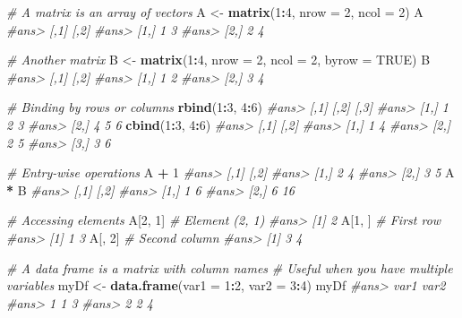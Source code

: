 \documentclass[]{book}
\newenvironment{Shaded}{\begin{snugshade}}{\end{snugshade}}
\newcommand{\KeywordTok}[1]{\textcolor[rgb]{0.13,0.29,0.53}{\textbf{#1}}}
\newcommand{\DataTypeTok}[1]{\textcolor[rgb]{0.13,0.29,0.53}{#1}}
\newcommand{\DecValTok}[1]{\textcolor[rgb]{0.00,0.00,0.81}{#1}}
\newcommand{\StringTok}[1]{\textcolor[rgb]{0.31,0.60,0.02}{#1}}
\newcommand{\CommentTok}[1]{\textcolor[rgb]{0.56,0.35,0.01}{\textit{#1}}}
\newcommand{\OtherTok}[1]{\textcolor[rgb]{0.56,0.35,0.01}{#1}}
\newcommand{\OperatorTok}[1]{\textcolor[rgb]{0.81,0.36,0.00}{\textbf{#1}}}
\newcommand{\NormalTok}[1]{#1}
\theoremstyle{definition}
\theoremstyle{definition}
\theoremstyle{definition}
\theoremstyle{remark}
\begin{document}
\begin{Shaded}
\begin{Highlighting}[]
\CommentTok{# A matrix is an array of vectors}
\NormalTok{A <-}\StringTok{ }\KeywordTok{matrix}\NormalTok{(}\DecValTok{1}\OperatorTok{:}\DecValTok{4}\NormalTok{, }\DataTypeTok{nrow =} \DecValTok{2}\NormalTok{, }\DataTypeTok{ncol =} \DecValTok{2}\NormalTok{)}
\NormalTok{A}
\CommentTok{#ans>      [,1] [,2]}
\CommentTok{#ans> [1,]    1    3}
\CommentTok{#ans> [2,]    2    4}

\CommentTok{# Another matrix}
\NormalTok{B <-}\StringTok{ }\KeywordTok{matrix}\NormalTok{(}\DecValTok{1}\OperatorTok{:}\DecValTok{4}\NormalTok{, }\DataTypeTok{nrow =} \DecValTok{2}\NormalTok{, }\DataTypeTok{ncol =} \DecValTok{2}\NormalTok{, }\DataTypeTok{byrow =} \OtherTok{TRUE}\NormalTok{)}
\NormalTok{B}
\CommentTok{#ans>      [,1] [,2]}
\CommentTok{#ans> [1,]    1    2}
\CommentTok{#ans> [2,]    3    4}

\CommentTok{# Binding by rows or columns}
\KeywordTok{rbind}\NormalTok{(}\DecValTok{1}\OperatorTok{:}\DecValTok{3}\NormalTok{, }\DecValTok{4}\OperatorTok{:}\DecValTok{6}\NormalTok{)}
\CommentTok{#ans>      [,1] [,2] [,3]}
\CommentTok{#ans> [1,]    1    2    3}
\CommentTok{#ans> [2,]    4    5    6}
\KeywordTok{cbind}\NormalTok{(}\DecValTok{1}\OperatorTok{:}\DecValTok{3}\NormalTok{, }\DecValTok{4}\OperatorTok{:}\DecValTok{6}\NormalTok{)}
\CommentTok{#ans>      [,1] [,2]}
\CommentTok{#ans> [1,]    1    4}
\CommentTok{#ans> [2,]    2    5}
\CommentTok{#ans> [3,]    3    6}

\CommentTok{# Entry-wise operations}
\NormalTok{A }\OperatorTok{+}\StringTok{ }\DecValTok{1}
\CommentTok{#ans>      [,1] [,2]}
\CommentTok{#ans> [1,]    2    4}
\CommentTok{#ans> [2,]    3    5}
\NormalTok{A }\OperatorTok{*}\StringTok{ }\NormalTok{B}
\CommentTok{#ans>      [,1] [,2]}
\CommentTok{#ans> [1,]    1    6}
\CommentTok{#ans> [2,]    6   16}

\CommentTok{# Accessing elements}
\NormalTok{A[}\DecValTok{2}\NormalTok{, }\DecValTok{1}\NormalTok{] }\CommentTok{# Element (2, 1)}
\CommentTok{#ans> [1] 2}
\NormalTok{A[}\DecValTok{1}\NormalTok{, ] }\CommentTok{# First row}
\CommentTok{#ans> [1] 1 3}
\NormalTok{A[, }\DecValTok{2}\NormalTok{] }\CommentTok{# Second column}
\CommentTok{#ans> [1] 3 4}

\CommentTok{# A data frame is a matrix with column names}
\CommentTok{# Useful when you have multiple variables}
\NormalTok{myDf <-}\StringTok{ }\KeywordTok{data.frame}\NormalTok{(}\DataTypeTok{var1 =} \DecValTok{1}\OperatorTok{:}\DecValTok{2}\NormalTok{, }\DataTypeTok{var2 =} \DecValTok{3}\OperatorTok{:}\DecValTok{4}\NormalTok{)}
\NormalTok{myDf}
\CommentTok{#ans>   var1 var2}
\CommentTok{#ans> 1    1    3}
\CommentTok{#ans> 2    2    4}


\end{Highlighting}
\end{Shaded}
\end{document}
